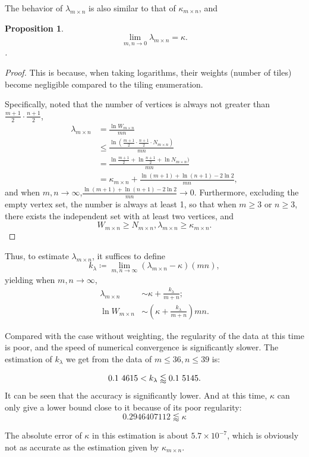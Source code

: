 \documentclass[11pt]{article}
\newtheorem{proposition}{Proposition}[section]
\begin{document}
    The behavior of $\lambda_{m\times n}$ is also similar to that of $\kappa_{m\times n}$,
    and
    \begin{proposition}
        \[
            \lim_{m,n\rightarrow0} \lambda_{m\times n}=\kappa.
        \].
    \end{proposition}
    \begin{proof}
        This is because, when taking logarithms, their weights (number of tiles) become negligible compared to the tiling enumeration.

        Specifically, noted that the number of vertices is always not greater than $\frac{m+1}{2}\cdot\frac{n+1}{2}$,
        \begin{align*}
             \lambda_{m\times n} &= \frac{\ln W_{m\times n}}{mn}\\
                                &\leq \frac{\ln(\frac{m+1}{2}\cdot\frac{n+1}{2}\cdot N_{m\times n})}{mn}\\
                                &= \frac{\ln\frac{m+1}{2}+\ln\frac{n+1}{2} +\ln N_{m\times n})}{mn}\\
                                &=\kappa_{m\times n}+\frac{\ln(m+1)+\ln(n+1)-2\ln 2}{mn},
        \end{align*}
        and when $m,n\rightarrow\infty$,$\frac{\ln(m+1)+\ln(n+1)-2\ln 2}{mn}\rightarrow0$.
        Furthermore, excluding the empty vertex set, the number is always at least 1, so that when $m\geq 3$ or $n \geq 3$,
        there exists the independent set with at least two vertices, and
        \[
            W_{m\times n}\geq N_{m\times n}, \lambda_{m\times n}\geq\kappa_{m\times n}.
        \]
    \end{proof}
    Thus, to estimate $\lambda_{m\times n}$, it suffices to define
    \[
        k_\lambda \coloneq \lim_{m,n\rightarrow\infty} (\lambda_{m\times n}-\kappa)(mn),
    \]
    yielding when $m,n\rightarrow\infty$,
    \begin{align*}
        \lambda_{m\times n} & \sim \kappa+\frac{k_\lambda}{m+n};\\
        \ln W_{m \times n}  & \sim (\kappa+\frac{k_\lambda}{m+n})mn.
    \end{align*}

    Compared with the case without weighting, the regularity of the data at this time is poor, and the speed of numerical convergence is significantly slower.
    The estimation of $k_\lambda$ we get from the data of $m\leq 36,n\leq39$ is:

    \[
        0.1~4615 < k_\lambda \lessapprox 0.1~5145. \\
    \]
    It can be seen that the accuracy is significantly lower.
    And at this time, $\kappa$ can only give a lower bound close to it because of its poor regularity:
    \[
        0.2946407112 \lessapprox \kappa
    \]

    The absolute error of $\kappa$ in this estimation is about $5.7 \times10^{-7}$, which is obviously not as accurate as the estimation given by $\kappa_{m\times n}$.

    
    
\end{document}
